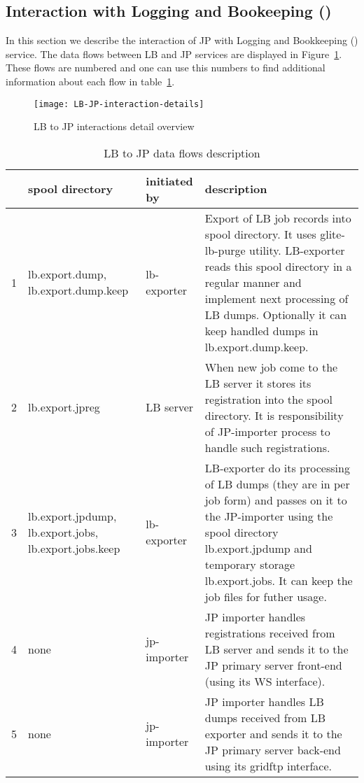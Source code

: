 \subsection{Interaction with Logging and Bookeeping (\LB)}

In this section we describe the interaction of JP with Logging and Bookkeeping
(\LB) service.  The data flows between LB and JP services are displayed in
Figure~\ref{fig:LB-JP-interactions}.  These flows are numbered and one can use
this numbers to find additional information about each flow in
table~\ref{tab:LB-JP-interactions}.

\begin{figure}[htpb]
  \centering
  \texttt{[image: LB-JP-interaction-details]}
  \caption{LB to JP interactions detail overview}
  \label{fig:LB-JP-interactions}
\end{figure}

\begin{table}[htpb]
 \centering
  \begin{tabular}{|c|p{3cm}|l|p{9cm}|}
    \hline
    &spool directory&initiated by&description\\
    \hline
    \hline
    1&lb.export.dump,
      lb.export.dump.keep&lb-exporter&
      Export of LB job records into spool directory. It uses glite-lb-purge utility. LB-exporter reads this spool directory in a regular manner and implement next processing of LB dumps. Optionally it can keep handled dumps in lb.export.dump.keep.\\
    \hline
    2&lb.export.jpreg&LB server&When new job come to the LB server 
    it stores its
    registration into the spool directory. It is responsibility of
    JP-importer process to handle such registrations.\\
    \hline
    3&lb.export.jpdump,
      lb.export.jobs,
      lb.export.jobs.keep&lb-exporter&
      LB-exporter do its processing of LB dumps (they are in per job form) and passes on it to the JP-importer using the spool directory lb.export.jpdump and temporary storage lb.export.jobs. It can keep the job files for futher usage.\\
    \hline
    4&none&jp-importer&JP importer handles registrations received from LB
    server and sends it to the JP primary server front-end (using its WS
    interface).\\
    \hline
    5&none&jp-importer&JP importer handles LB dumps received from LB
    exporter and sends it to the JP primary server back-end using its
    gridftp interface.\\
    \hline
  \end{tabular}
  \caption{LB to JP data flows description}
  \label{tab:LB-JP-interactions}
\end{table}


